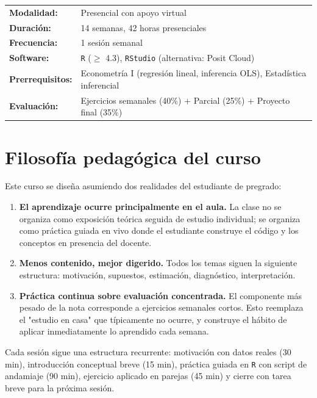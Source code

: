 \documentclass[11pt,letterpaper]{article}
\begin{document}
\begin{tabular}{@{}p{4.5cm} p{10cm}@{}}
\textbf{Modalidad:} & Presencial con apoyo virtual \\
\textbf{Duración:} & 14 semanas, 42 horas presenciales \\
\textbf{Frecuencia:} & 1 sesión semanal \\
\textbf{Software:} & \texttt{R} ($\geq$ 4.3), \texttt{RStudio} (alternativa: Posit Cloud) \\
\textbf{Prerrequisitos:} & Econometría I (regresión lineal, inferencia OLS), Estadística inferencial \\
\textbf{Evaluación:} & Ejercicios semanales (40\%) + Parcial (25\%) + Proyecto final (35\%) \\
\end{tabular}

\section{Filosofía pedagógica del curso}

Este curso se diseña asumiendo dos realidades del estudiante de pregrado:

\begin{enumerate}[leftmargin=*, itemsep=0.2em]
  \item \textbf{El aprendizaje ocurre principalmente en el aula.} La clase no se organiza como exposición teórica seguida de estudio individual; se organiza como práctica guiada en vivo donde el estudiante construye el código y los conceptos en presencia del docente.
  \item \textbf{Menos contenido, mejor digerido.} Todos los temas siguen la siguiente estructura: motivación, supuestos, estimación, diagnóstico, interpretación.
  \item \textbf{Práctica continua sobre evaluación concentrada.} El componente más pesado de la nota corresponde a ejercicios semanales cortos. Esto reemplaza el "estudio en casa" que típicamente no ocurre, y construye el hábito de aplicar inmediatamente lo aprendido cada semana.
\end{enumerate}

Cada sesión sigue una estructura recurrente: motivación con datos reales (30 min), introducción conceptual breve (15 min), práctica guiada en \texttt{R} con script de andamiaje (90 min), ejercicio aplicado en parejas (45 min) y cierre con tarea breve para la próxima sesión.
\end{document}
